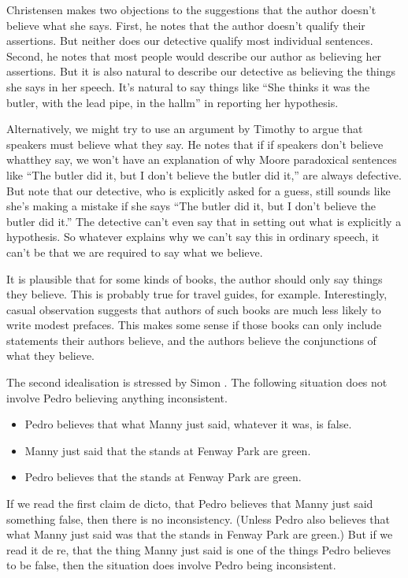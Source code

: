 \documentclass[11pt,]{book}
\providecommand{\tightlist}{%
  \setlength{\itemsep}{0pt}\setlength{\parskip}{0pt}}
\begin{document}
Christensen makes two objections to the suggestions that the author doesn't believe what she says. First, he notes that the author doesn't qualify their assertions. But neither does our detective qualify most individual sentences. Second, he notes that most people would describe our author as believing her assertions. But it is also natural to describe our detective as believing the things she says in her speech. It's natural to say things like ``She thinks it was the butler, with the lead pipe, in the hallm'' in reporting her hypothesis.

Alternatively, we might try to use an argument by Timothy \citet{Williamson2000} to argue that speakers must believe what they say. He notes that if if speakers don't believe whatthey say, we won't have an explanation of why Moore paradoxical sentences like ``The butler did it, but I don't believe the butler did it,'' are always defective. But note that our detective, who is explicitly asked for a guess, still sounds like she's making a mistake if she says ``The butler did it, but I don't believe the butler did it.'' The detective can't even say that in setting out what is explicitly a hypothesis. So whatever explains why we can't say this in ordinary speech, it can't be that we are required to say what we believe.

It is plausible that for some kinds of books, the author should only say things they believe. This is probably true for travel guides, for example. Interestingly, casual observation suggests that authors of such books are much less likely to write modest prefaces. This makes some sense if those books can only include statements their authors believe, and the authors believe the conjunctions of what they believe.

The second idealisation is stressed by Simon \citet{Evnine1999}. The following situation does not involve Pedro believing anything inconsistent.

\begin{itemize}
\tightlist
\item
  Pedro believes that what Manny just said, whatever it was, is false.
\item
  Manny just said that the stands at Fenway Park are green.
\item
  Pedro believes that the stands at Fenway Park are green.
\end{itemize}

If we read the first claim de dicto, that Pedro believes that Manny just said something false, then there is no inconsistency. (Unless Pedro also believes that what Manny just said was that the stands in Fenway Park are green.) But if we read it de re, that the thing Manny just said is one of the things Pedro believes to be false, then the situation does involve Pedro being inconsistent.
\end{document}
